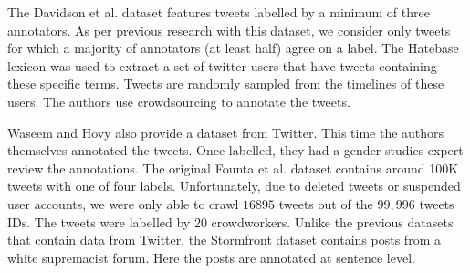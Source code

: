 \documentclass[a4paper,12pt]{report}
\begin{document}
	The Davidson et al. dataset features tweets labelled by a minimum of three annotators. As per previous research with this dataset, we consider only tweets for which a majority of annotators (at least half) agree on a label. The Hatebase lexicon was used to extract a set of twitter users that have tweets containing these specific terms. Tweets are randomly sampled from the timelines of these users. The authors use crowdsourcing to annotate the tweets.
	
	Waseem and Hovy also provide a dataset from Twitter. This time the authors themselves annotated the tweets. Once labelled, they had a gender studies expert review the annotations. The original Founta et al. dataset contains around 100K tweets with one of four labels. Unfortunately, due to deleted tweets or suspended user accounts, we were only able to crawl $16895$ tweets out of the $99,996$ tweets IDs. The tweets were labelled by 20 crowdworkers. Unlike the previous datasets that contain data from Twitter, the Stormfront dataset contains posts from a white supremacist forum. Here the posts are annotated at sentence level.
	
\end{document}
